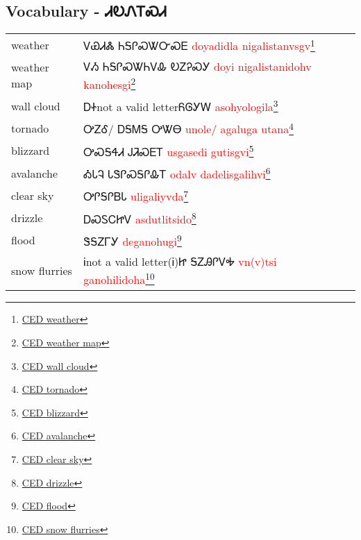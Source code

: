\begin{multicols}
\newpage\subsection{Vocabulary - ᏗᎧᏁᎢᏍᏗ 
}
\begin{minipage}{\linewidth}
\begin{tabular}{p{5cm} p{9cm}}
weather & ᏙᏯᏗᏜ ᏂᎦᎵᏍᏔᏅᏍᎬ 
 \newline \textcolor{red}{doyadidla nigalistanvsgv}\footnote{\href{https://cherokeedictionary.net/share/76306}{CED weather}}\\
weather map & ᏙᏱ ᏂᎦᎵᏍᏔᏂᏙᎲ ᎧᏃᎮᏍᎩ 
 \newline \textcolor{red}{doyi nigalistanidohv kanohesgi}\footnote{\href{https://cherokeedictionary.net/share/76304}{CED weather map}}\\
wall cloud & ᎠᏐnot a valid letterᏲᎶᎩᎳ 
 \newline \textcolor{red}{asohyologila}\footnote{\href{https://cherokeedictionary.net/share/101954}{CED wall cloud}}\\
tornado & ᎤᏃᎴ/ ᎠᎦᎷᎦ ᎤᏔᎾ 
 \newline \textcolor{red}{unole/ agaluga utana}\footnote{\href{https://cherokeedictionary.net/share/101955}{CED tornado}}\\
blizzard & ᎤᏍᎦᏎᏗ ᎫᏘᏍᎬᎢ 
 \newline \textcolor{red}{usgasedi gutisgvi}\footnote{\href{https://cherokeedictionary.net/share/101956}{CED blizzard}}\\
avalanche & ᎣᏓᎸ ᏓᏕᎵᏍᎦᎵᎲᎢ 
 \newline \textcolor{red}{odalv dadelisgalihvi}\footnote{\href{https://cherokeedictionary.net/share/101957}{CED avalanche}}\\
clear sky & ᎤᎵᎦᎵᏴᏓ 
 \newline \textcolor{red}{uligaliyvda}\footnote{\href{https://cherokeedictionary.net/share/101958}{CED clear sky}}\\
drizzle & ᎠᏍᏚᏟᏥᏙ 
 \newline \textcolor{red}{asdutlitsido}\footnote{\href{https://cherokeedictionary.net/share/101959}{CED drizzle}}\\
flood & ᏕᎦᏃᎱᎩ 
 \newline \textcolor{red}{deganohugi}\footnote{\href{https://cherokeedictionary.net/share/101960}{CED flood}}\\
snow flurries & Ꭵnot a valid letter(Ꭵ)Ꮵ  ᎦᏃᎯᎵᏙᎭ 
 \newline \textcolor{red}{vn(v)tsi  ganohilidoha}\footnote{\href{https://cherokeedictionary.net/share/101961}{CED snow flurries}}\\

\end{tabular}
\end{minipage}
\end{multicols}
